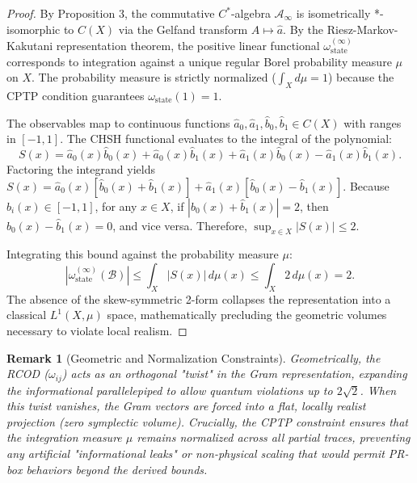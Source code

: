 \documentclass[11pt, a4paper]{article}
\newtheorem{remark}{Remark}
\begin{document}
\begin{proof}
By Proposition 3, the commutative $C^*$-algebra $\mathcal{A}_\infty$ is isometrically *-isomorphic to $C(X)$ via the Gelfand transform $A \mapsto \hat{a}$. By the Riesz-Markov-Kakutani representation theorem, the positive linear functional $\omega_{\mathrm{state}}^{(\infty)}$ corresponds to integration against a unique regular Borel probability measure $\mu$ on $X$. The probability measure is strictly normalized ($\int_X d\mu = 1$) because the CPTP condition guarantees $\omega_{\mathrm{state}}(1) = 1$.

The observables map to continuous functions $\hat{a}_0, \hat{a}_1, \hat{b}_0, \hat{b}_1 \in C(X)$ with ranges in $[-1, 1]$. The CHSH functional evaluates to the integral of the polynomial:
\begin{equation}
    S(x) = \hat{a}_0(x)\hat{b}_0(x) + \hat{a}_0(x)\hat{b}_1(x) + \hat{a}_1(x)\hat{b}_0(x) - \hat{a}_1(x)\hat{b}_1(x).
\end{equation}
Factoring the integrand yields $S(x) = \hat{a}_0(x)[\hat{b}_0(x) + \hat{b}_1(x)] + \hat{a}_1(x)[\hat{b}_0(x) - \hat{b}_1(x)]$. Because $\hat{b}_i(x) \in [-1, 1]$, for any $x \in X$, if $|\hat{b}_0(x) + \hat{b}_1(x)| = 2$, then $\hat{b}_0(x) - \hat{b}_1(x) = 0$, and vice versa. Therefore, $\sup_{x \in X} |S(x)| \le 2$.

Integrating this bound against the probability measure $\mu$:
\begin{equation}
    |\omega_{\mathrm{state}}^{(\infty)}(\mathcal{B})| \le \int_X |S(x)| \, d\mu(x) \le \int_X 2 \, d\mu(x) = 2.
\end{equation}
The absence of the skew-symmetric 2-form collapses the representation into a classical $L^1(X, \mu)$ space, mathematically precluding the geometric volumes necessary to violate local realism.
\end{proof}

\begin{remark}[Geometric and Normalization Constraints]
Geometrically, the RCOD ($\omega_{ij}$) acts as an orthogonal "twist" in the Gram representation, expanding the informational parallelepiped to allow quantum violations up to $2\sqrt{2}$. When this twist vanishes, the Gram vectors are forced into a flat, locally realist projection (zero symplectic volume). Crucially, the CPTP constraint ensures that the integration measure $\mu$ remains normalized across all partial traces, preventing any artificial "informational leaks" or non-physical scaling that would permit PR-box behaviors beyond the derived bounds.
\end{remark}
\end{document}
